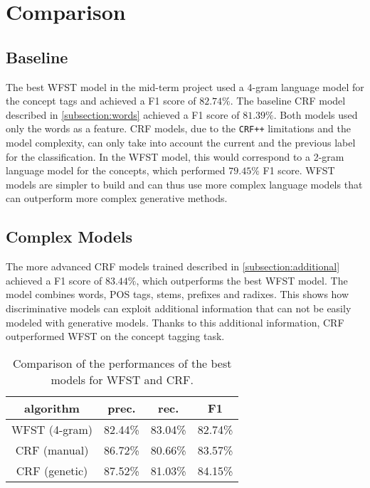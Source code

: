 \section{Comparison}
\label{sec:comparison}

\subsection{Baseline}
The best \ac{WFST} model in the mid-term project used a 4-gram language model for the concept tags and achieved a F1 score of $82.74\%$.
The baseline \ac{CRF} model described in \cref{subsection:words} achieved a F1 score of $81.39\%$.
Both models used only the words as a feature.
\ac{CRF} models, due to the \texttt{CRF++} limitations and the model complexity, can only take into account the current and the previous label for the classification.
In the \ac{WFST} model, this would correspond to a 2-gram language model for the concepts, which performed $79.45\%$ F1 score.
\ac{WFST} models are simpler to build and can thus use more complex language models that can outperform more complex generative methods.

\subsection{Complex Models}
The more advanced \ac{CRF} models trained described in \cref{subsection:additional} achieved a F1 score of $83.44\%$, which outperforms the best \ac{WFST} model.
The model combines words, POS tags, stems, prefixes and radixes.
This shows how discriminative models can exploit additional information that can not be easily modeled with generative models.
Thanks to this additional information, \ac{CRF} outperformed \ac{WFST} on the concept tagging task.

\begin{table}[h]
	\centering
    \begin{tabular}{ c c c c }
    	\toprule
    		\multicolumn{1}{c}{algorithm} & \multicolumn{1}{c}{prec.} & \multicolumn{1}{c}{rec.} & \multicolumn{1}{c}{F1} \\
    	\midrule
            WFST (4-gram) & 82.44\% & 83.04\% & 82.74\% \\
            CRF (manual) & 86.72\% & 80.66\% & 83.57\% \\
			CRF (genetic) & 87.52\% & 81.03\% & 84.15\% \\
    	\bottomrule
	\end{tabular}
    \caption{Comparison of the performances of the best models for \ac{WFST} and \ac{CRF}.}
	\label{tab:best}
\end{table}

